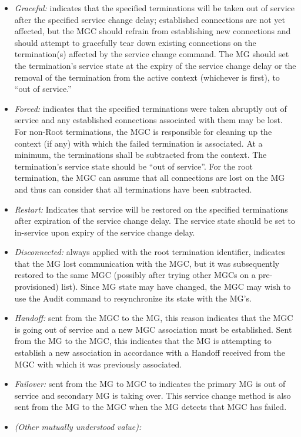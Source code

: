 \documentclass[letterpaper,final,notitlepage,twocolumn,10pt,twoside]{article}
\begin{document}
\begin{itemize}

\item{\it Graceful:} indicates that the specified terminations will be taken
out of service after the specified service change delay; established
connections are not yet affected, but the MGC should refrain from establishing
new connections and should attempt to gracefully tear down existing
connections on the termination(s) affected by the service change command.  The
MG should set the termination's service state at the expiry of the service
change delay or the removal of the termination from the active context
(whichever is first), to ``out of service.''

\item{\it Forced:} indicates that the specified terminations were taken
abruptly out of service and any established connections associated with them
may be lost.  For non-Root terminations, the MGC is responsible for cleaning
up the context (if any) with which the failed termination is associated.  At a
minimum, the terminations shall be subtracted from the context.  The
termination's service state should be ``out of service''.  For the root
termination, the MGC can assume that all connections are lost on the MG and
thus can consider that all terminations have been subtracted.

\item{\it Restart:} Indicates that service will be restored on the specified
terminations after expiration of the service change delay.  The service state
should be set to in-service upon expiry of the service change delay.

\item{\it Disconnected:} always applied with the root termination identifier,
indicates that the MG lost communication with the MGC, but it was subsequently
restored to the same MGC (possibly after trying other MGCs on a
pre-provisioned) list).  Since MG state may have changed, the MGC may wish to
use the Audit command to resynchronize its state with the MG's.

\item{\it Handoff:} sent from the MGC to the MG, this reason indicates that the
MGC is going out of service and a new MGC association must be established.
Sent from the MG to the MGC, this indicates that the MG is attempting to
establish a new association in accordance with a Handoff received from the MGC
with which it was previously associated.

\item{\it Failover:} sent from the MG to MGC to indicates the primary MG is
out of service and  secondary MG is taking over.  This service change method
is also sent from the MG to the MGC when the MG detects that MGC has failed.

\item{\it (Other mutually understood value):}

\end{itemize}
\end{document}
